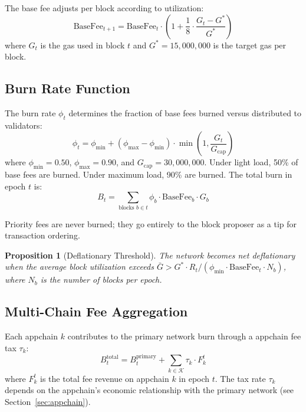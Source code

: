 \documentclass[11pt,a4paper]{article}
\newtheorem{proposition}[theorem]{Proposition}
\begin{document}
The base fee adjusts per block according to utilization:
\begin{equation}\label{eq:basefee}
    \text{BaseFee}_{t+1} = \text{BaseFee}_t \cdot \left(1 + \frac{1}{8} \cdot \frac{G_t - G^*}{G^*}\right)
\end{equation}
where $G_t$ is the gas used in block $t$ and $G^* = 15{,}000{,}000$ is the target gas per block.

\subsection{Burn Rate Function}

The burn rate $\phi_t$ determines the fraction of base fees burned versus distributed to validators:
\begin{equation}\label{eq:burn}
    \phi_t = \phi_{\min} + (\phi_{\max} - \phi_{\min}) \cdot \min\left(1, \frac{G_t}{G_{\text{cap}}}\right)
\end{equation}
where $\phi_{\min} = 0.50$, $\phi_{\max} = 0.90$, and $G_{\text{cap}} = 30{,}000{,}000$. Under light load, 50\% of base fees are burned. Under maximum load, 90\% are burned. The total burn in epoch $t$ is:
\begin{equation}
    B_t = \sum_{\text{blocks } b \in t} \phi_b \cdot \text{BaseFee}_b \cdot G_b
\end{equation}

Priority fees are never burned; they go entirely to the block proposer as a tip for transaction ordering.

\begin{proposition}[Deflationary Threshold]
The network becomes net deflationary when the average block utilization exceeds $\bar{G} > G^* \cdot R_t / (\phi_{\min} \cdot \text{BaseFee}_t \cdot N_b)$, where $N_b$ is the number of blocks per epoch.
\end{proposition}

\subsection{Multi-Chain Fee Aggregation}

Each appchain $k$ contributes to the primary network burn through a appchain fee tax $\tau_k$:
\begin{equation}
    B_t^{\text{total}} = B_t^{\text{primary}} + \sum_{k \in \mathcal{K}} \tau_k \cdot F_k^t
\end{equation}
where $F_k^t$ is the total fee revenue on appchain $k$ in epoch $t$. The tax rate $\tau_k$ depends on the appchain's economic relationship with the primary network (see Section~\ref{sec:appchain}).
\end{document}
